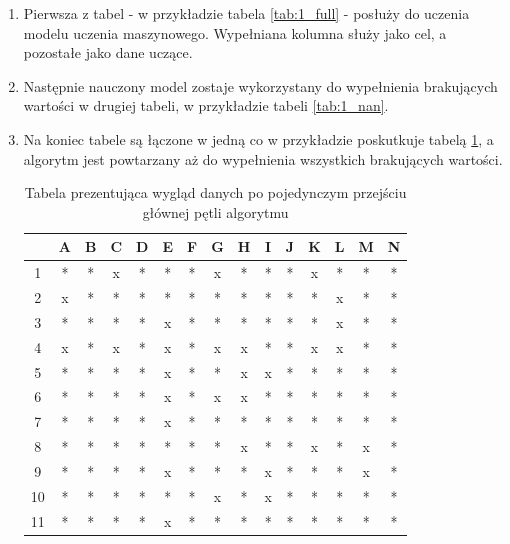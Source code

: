 \documentclass[12pt,twoside]{article}
\begin{document}
\begin{enumerate}[label=\arabic*), leftmargin=1.25cm]
    \item Pierwsza z tabel - w przykładzie tabela \ref{tab:1_full} - posłuży do uczenia modelu uczenia maszynowego.
          Wypełniana kolumna służy jako cel, a pozostałe jako dane uczące.
    \item Następnie nauczony model zostaje wykorzystany do wypełnienia brakujących wartości w drugiej tabeli,
          w przykładzie tabeli \ref{tab:1_nan}.
    \item Na koniec tabele są łączone w jedną co w przykładzie poskutkuje tabelą \ref{tab:1_end},
          a algorytm jest powtarzany aż do wypełnienia wszystkich brakujących wartości.

          \begin{table}[ht]
              \caption{Tabela prezentująca wygląd danych po pojedynczym przejściu głównej pętli algorytmu}
              \centering
              \begin{tabular}{|c|c|c|c|c|c|c|c|c|c|c|c|c|c|c|}
                  \hline
                     & A & B & C & D & E & F & G & H & I & J & K & L & M & N \\ \hline
                  1  & * & * & x & * & * & * & x & * & * & * & x & * & * & * \\ \hline
                  2  & x & * & * & * & * & * & * & * & * & * & * & x & * & * \\ \hline
                  3  & * & * & * & * & x & * & * & * & * & * & * & x & * & * \\ \hline
                  4  & x & * & x & * & x & * & x & x & * & * & x & x & * & * \\ \hline
                  5  & * & * & * & * & x & * & * & x & x & * & * & * & * & * \\ \hline
                  6  & * & * & * & * & x & * & x & x & * & * & * & * & * & * \\ \hline
                  7  & * & * & * & * & x & * & * & * & * & * & * & * & * & * \\ \hline
                  8  & * & * & * & * & * & * & * & x & * & * & x & * & x & * \\ \hline
                  9  & * & * & * & * & x & * & * & * & x & * & * & * & x & * \\ \hline
                  10 & * & * & * & * & * & * & x & * & x & * & * & * & * & * \\ \hline
                  11 & * & * & * & * & x & * & * & * & * & * & * & * & * & * \\ \hline
              \end{tabular}
              \label{tab:1_end}
          \end{table}
          \FloatBarrier
\end{enumerate}
\end{document}
